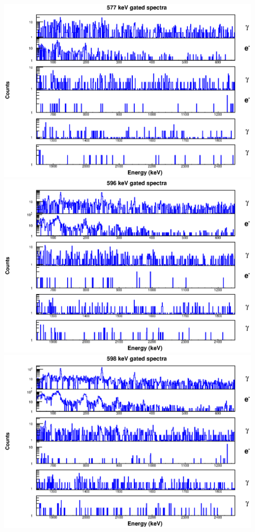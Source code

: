 \includegraphics[scale=0.8]{154Gd_Appendix/577_combined.eps}
\includegraphics[scale=0.8]{154Gd_Appendix/596_combined.eps}
\includegraphics[scale=0.8]{154Gd_Appendix/598_combined.eps}
